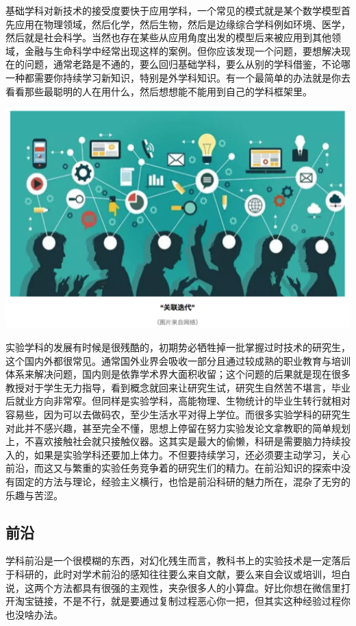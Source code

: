 \documentclass[]{book}
\begin{document}
基础学科对新技术的接受度要快于应用学科，一个常见的模式就是某个数学模型首先应用在物理领域，然后化学，然后生物，然后是边缘综合学科例如环境、医学，然后就是社会科学。当然也存在某些从应用角度出发的模型后来被应用到其他领域，金融与生命科学中经常出现这样的案例。但你应该发现一个问题，要想解决现在的问题，通常老路是不通的，要么回归基础学科，要么从别的学科借鉴，不论哪一种都需要你持续学习新知识，特别是外学科知识。有一个最简单的办法就是你去看看那些最聪明的人在用什么，然后想想能不能用到自己的学科框架里。

\includegraphics[width=6.67in]{images/hhcs5}

实验学科的发展有时候是很残酷的，初期势必牺牲掉一批掌握过时技术的研究生，这个国内外都很常见。通常国外业界会吸收一部分且通过较成熟的职业教育与培训体系来解决问题，国内则是依靠学术界大面积收留；这个问题的后果就是现在很多教授对于学生无力指导，看到概念就回来让研究生试，研究生自然苦不堪言，毕业后就业方向非常窄。但同样是实验学科，高能物理、生物统计的毕业生转行就相对容易些，因为可以去做码农，至少生活水平对得上学位。而很多实验学科的研究生对此并不感兴趣，甚至完全不懂，思想上停留在努力实验发论文拿教职的简单规划上，不喜欢接触社会就只接触仪器。这其实是最大的偷懒，科研是需要脑力持续投入的，如果是实验学科还要加上体力。不但要持续学习，还必须要主动学习，关心前沿，而这又与繁重的实验任务竞争着的研究生们的精力。在前沿知识的探索中没有固定的方法与理论，经验主义横行，也恰是前沿科研的魅力所在，混杂了无穷的乐趣与苦涩。

\subsection{前沿}

学科前沿是一个很模糊的东西，对幻化残生而言，教科书上的实验技术是一定落后于科研的，此时对学术前沿的感知往往要么来自文献，要么来自会议或培训，坦白说，这两个方法都具有很强的主观性，夹杂很多人的小算盘。好比你想在微信里打开淘宝链接，不是不行，就是要通过复制过程恶心你一把，但其实这种经验过程你也没啥办法。
\end{document}
